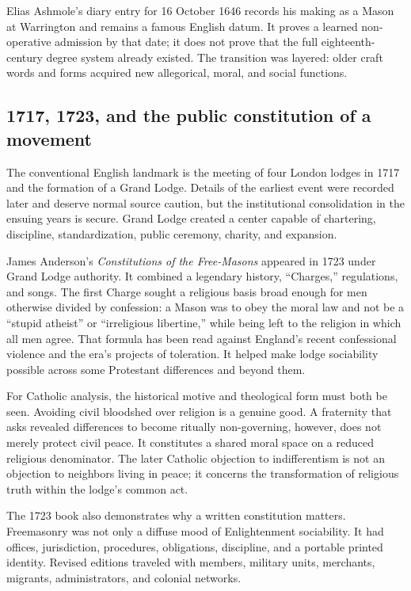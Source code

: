 Elias Ashmole's diary entry for 16 October 1646 records his making as a Mason at Warrington and remains a famous English datum. It proves a learned non-operative admission by that date; it does not prove that the full eighteenth-century degree system already existed. The transition was layered: older craft words and forms acquired new allegorical, moral, and social functions.

\subsection{1717, 1723, and the public constitution of a movement}

The conventional English landmark is the meeting of four London lodges in 1717 and the formation of a Grand Lodge. Details of the earliest event were recorded later and deserve normal source caution, but the institutional consolidation in the ensuing years is secure. Grand Lodge created a center capable of chartering, discipline, standardization, public ceremony, charity, and expansion.

James Anderson's \emph{Constitutions of the Free-Masons} appeared in 1723 under Grand Lodge authority. It combined a legendary history, “Charges,” regulations, and songs. The first Charge sought a religious basis broad enough for men otherwise divided by confession: a Mason was to obey the moral law and not be a “stupid atheist” or “irreligious libertine,” while being left to the religion in which all men agree. That formula has been read against England's recent confessional violence and the era's projects of toleration. It helped make lodge sociability possible across some Protestant differences and beyond them.

For Catholic analysis, the historical motive and theological form must both be seen. Avoiding civil bloodshed over religion is a genuine good. A fraternity that asks revealed differences to become ritually non-governing, however, does not merely protect civil peace. It constitutes a shared moral space on a reduced religious denominator. The later Catholic objection to indifferentism is not an objection to neighbors living in peace; it concerns the transformation of religious truth within the lodge's common act.

The 1723 book also demonstrates why a written constitution matters. Freemasonry was not only a diffuse mood of Enlightenment sociability. It had offices, jurisdiction, procedures, obligations, discipline, and a portable printed identity. Revised editions traveled with members, military units, merchants, migrants, administrators, and colonial networks.


